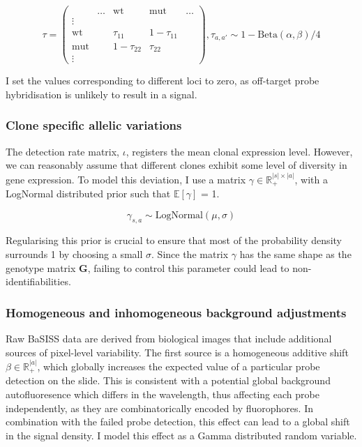 \begin{equation}
 {\tau} = \left(\begin{array}{c|cccc}
       & \ldots & \text{wt} & \text{mut} & \ldots \\ 
\hline
 \vdots &  &        &        & \\
\text{wt}      &  & \tau_{11} & 1-\tau_{11} &  \\
\text{mut}     &  & 1-\tau_{22} & \tau_{22} &  \\
\vdots  &  &        &        & 
\end{array}\right), {\tau}_{a,a'} \sim 1-\text{Beta}(\alpha, \beta)/4
\end{equation}

I set the values corresponding to different loci to zero, as off-target probe hybridisation is unlikely to result in a signal.

\subsubsection*{Clone specific allelic variations}

The detection rate matrix, $\iota$, registers the mean clonal expression level. However, we can reasonably assume that different clones exhibit some level of diversity in gene expression. To model this deviation, I use a matrix $\gamma \in \mathbb{R}_{+}^{|s|\times|a|}$, with a LogNormal distributed prior such that $\mathbb{E}[\gamma]$ = 1.

\begin{equation} 
\gamma_{s,a} \sim \text{LogNormal}(\mu, \sigma)
\end{equation}

Regularising this prior is crucial to ensure that most of the probability density surrounds 1 by choosing a small $\sigma$. Since the matrix $\gamma$ has the same shape as the genotype matrix $\mathbf{G}$, failing to control this parameter could lead to non-identifiabilities.

\subsubsection*{Homogeneous and inhomogeneous background adjustments}

Raw BaSISS data are derived from biological images that include additional sources of pixel-level variability. The first source is a homogeneous additive shift $\beta \in \mathbb{R}_{+}^{|a|}$, which globally increases the expected value of a particular probe detection on the slide. This is consistent with a potential global background autofluoresence which differs in the wavelength, thus affecting each probe independently, as they are combinatorically encoded by fluorophores. In combination with the failed probe detection, this effect can lead to a global shift in the signal density. I model this effect as a Gamma distributed random variable.

